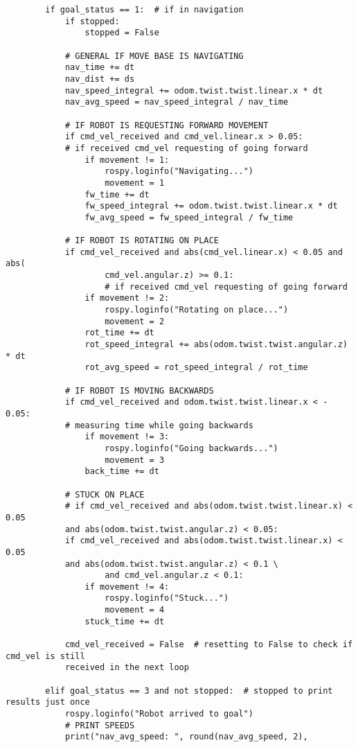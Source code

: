 \begin{verbatim}
        if goal_status == 1:  # if in navigation
            if stopped:
                stopped = False

            # GENERAL IF MOVE BASE IS NAVIGATING
            nav_time += dt
            nav_dist += ds
            nav_speed_integral += odom.twist.twist.linear.x * dt
            nav_avg_speed = nav_speed_integral / nav_time

            # IF ROBOT IS REQUESTING FORWARD MOVEMENT
            if cmd_vel_received and cmd_vel.linear.x > 0.05:  
            # if received cmd_vel requesting of going forward
                if movement != 1:
                    rospy.loginfo("Navigating...")
                    movement = 1
                fw_time += dt
                fw_speed_integral += odom.twist.twist.linear.x * dt
                fw_avg_speed = fw_speed_integral / fw_time

            # IF ROBOT IS ROTATING ON PLACE
            if cmd_vel_received and abs(cmd_vel.linear.x) < 0.05 and abs(
                    cmd_vel.angular.z) >= 0.1:  
                    # if received cmd_vel requesting of going forward
                if movement != 2:
                    rospy.loginfo("Rotating on place...")
                    movement = 2
                rot_time += dt
                rot_speed_integral += abs(odom.twist.twist.angular.z) * dt
                rot_avg_speed = rot_speed_integral / rot_time

            # IF ROBOT IS MOVING BACKWARDS
            if cmd_vel_received and odom.twist.twist.linear.x < - 0.05:  
            # measuring time while going backwards
                if movement != 3:
                    rospy.loginfo("Going backwards...")
                    movement = 3
                back_time += dt

            # STUCK ON PLACE
            # if cmd_vel_received and abs(odom.twist.twist.linear.x) < 0.05 
            and abs(odom.twist.twist.angular.z) < 0.05:
            if cmd_vel_received and abs(odom.twist.twist.linear.x) < 0.05
            and abs(odom.twist.twist.angular.z) < 0.1 \
                    and cmd_vel.angular.z < 0.1:
                if movement != 4:
                    rospy.loginfo("Stuck...")
                    movement = 4
                stuck_time += dt

            cmd_vel_received = False  # resetting to False to check if cmd_vel is still 
            received in the next loop

        elif goal_status == 3 and not stopped:  # stopped to print results just once
            rospy.loginfo("Robot arrived to goal")
            # PRINT SPEEDS
            print("nav_avg_speed: ", round(nav_avg_speed, 2),
        

\end{verbatim}
